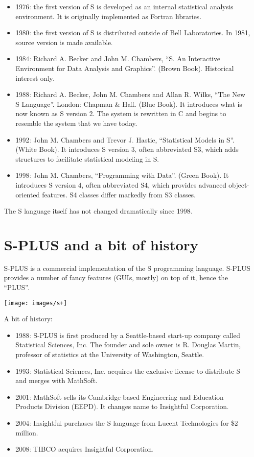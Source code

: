 \documentclass[]{book}
\providecommand{\tightlist}{%
  \setlength{\itemsep}{0pt}\setlength{\parskip}{0pt}}
\def\tightlist{}
\begin{document}
\begin{itemize}
\tightlist
\item
  1976: the first version of S is developed as an internal statistical
  analysis environment. It is originally implemented as Fortran
  libraries.
\item
  1980: the first version of S is distributed outside of Bell
  Laboratories. In 1981, source version is made available.
\item
  1984: Richard A. Becker and John M. Chambers, ``S. An Interactive
  Environment for Data Analysis and Graphics''. (Brown Book). Historical
  interest only.
\item
  1988: Richard A. Becker, John M. Chambers and Allan R. Wilks, ``The
  New S Language''. London: Chapman \& Hall. (Blue Book). It introduces
  what is now known as S version 2. The system is rewritten in C and
  begins to resemble the system that we have today.
\item
  1992: John M. Chambers and Trevor J. Hastie, ``Statistical Models in
  S''. (White Book). It introduces S version 3, often abbreviated S3,
  which adds structures to facilitate statistical modeling in S.
\item
  1998: John M. Chambers, ``Programming with Data''. (Green Book). It
  introduces S version 4, often abbreviated S4, which provides advanced
  object-oriented features. S4 classes differ markedly from S3 classes.
\end{itemize}

The S language itself has not changed dramatically since 1998.

\section{S-PLUS and a bit of history}\label{s-plus-and-a-bit-of-history}

S-PLUS is a commercial implementation of the S programming language.
S-PLUS provides a number of fancy features (GUIs, mostly) on top of it,
hence the ``PLUS''.

\texttt{[image: images/s+]}

A bit of history:

\begin{itemize}
\tightlist
\item
  1988: S-PLUS is first produced by a Seattle-based start-up company
  called Statistical Sciences, Inc. The founder and sole owner is R.
  Douglas Martin, professor of statistics at the University of
  Washington, Seattle.
\item
  1993: Statistical Sciences, Inc. acquires the exclusive license to
  distribute S and merges with MathSoft.
\item
  2001: MathSoft sells its Cambridge-based Engineering and Education
  Products Division (EEPD). It changes name to Insightful Corporation.
\item
  2004: Insightful purchases the S language from Lucent Technologies for
  \$2 million.
\item
  2008: TIBCO acquires Insightful Corporation.
\end{itemize}
\end{document}
